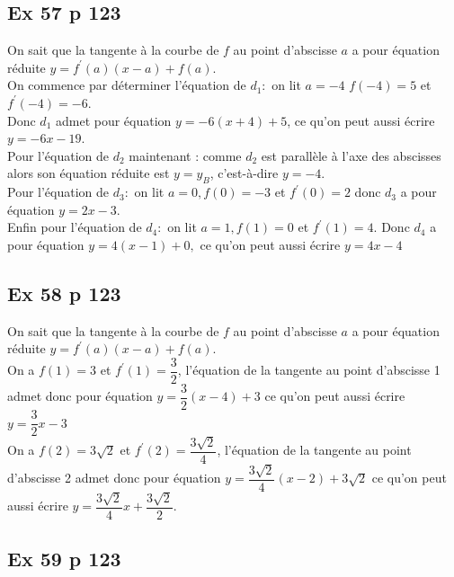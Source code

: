 \documentclass[12pt,a5paper]{book}
\begin{document}
\subsection*{Ex 57 p 123}

On sait que la tangente à la courbe de $f$ au point d'abscisse $a$ a pour équation réduite $y=f^{\prime}(a)(x-a)+f(a)$.\\

On commence par déterminer l'équation de $d_{1}:$ on lit $a=-4$ $f(-4)=5$ et $f^{\prime}(-4)=-6$.\\
Donc $d_{1}$ admet pour équation $y=-6(x+4)+5$, ce qu'on peut aussi écrire $y=-6 x-19$.\\

Pour l'équation de $d_{2}$ maintenant : comme $d_{2}$ est parallèle à l'axe des abscisses alors son équation réduite est $y=y_{B}$, c'est-à-dire $y=-4$.\\

Pour l'équation de $d_{3}:$ on lit $a=0, f(0)=-3$ et $ f^{\prime}(0)=2$ donc $d_{3}$ a pour équation $y=2 x-3$.\\

Enfin pour l'équation de $d_{4}:$ on lit $a=1, f(1)=0$ et $f^{\prime}(1)=4$. Donc $d_{4}$ a pour équation $y=4(x-1)+0,$ ce qu'on peut aussi écrire $y=4 x-4$

\subsection*{Ex 58 p 123}

On sait que la tangente à la courbe de $f$ au point d'abscisse $a$ a pour équation réduite $y=f^{\prime}(a)(x-a)+f(a)$.\\
On a $f(1)=3$ et $f^{\prime}(1)=\dfrac{3}{2}$, l'équation de la tangente au point d'abscisse 1 admet donc pour équation $y=\dfrac{3}{2}(x-4)+3$ ce qu'on peut aussi écrire $y=\dfrac{3}{2} x-3$\\

On a $f(2)=3 \sqrt{2}$ et $f^{\prime}(2)=\dfrac{3 \sqrt{2}}{4}$, l'équation de la tangente au point d'abscisse 2 admet donc pour
équation $y=\dfrac{3 \sqrt{2}}{4}(x-2)+3 \sqrt{2}$
ce qu'on peut aussi écrire $y=\dfrac{3 \sqrt{2}}{4} x+\dfrac{3 \sqrt{2}}{2}$.

\subsection*{Ex 59 p 123}
\end{document}
